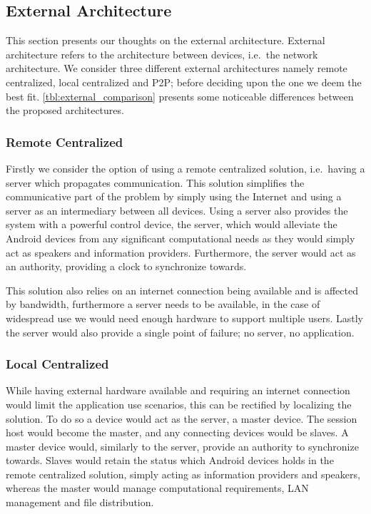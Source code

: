 \subsection{External Architecture}\label{sec:external_architectures}
This section presents our thoughts on the external architecture.
External architecture refers to the architecture between devices, i.e.\ the network architecture.
We consider three different external architectures namely remote centralized, local centralized and \ac{P2P}; before deciding upon the one we deem the best fit.
\cref{tbl:external_comparison} presents some  noticeable differences between the proposed architectures.

\subsubsection{Remote Centralized}
Firstly we consider the option of using a remote centralized solution, i.e.\ having a server which propagates communication.
This solution simplifies the communicative part of the problem by simply using the Internet and using a server as an intermediary between all devices.
Using a server also provides the system with a powerful control device, the server, which would alleviate the Android devices from any significant computational needs as they would simply act as speakers and information providers.
Furthermore, the server would act as an authority, providing a clock to synchronize towards.

This solution also relies on an internet connection being available and is affected by bandwidth, furthermore a server needs to be available, in the case of widespread use we would need enough hardware to support multiple users.
Lastly the server would also provide a single point of failure; no server, no application.

\subsubsection{Local Centralized}
While having external hardware available and requiring an internet connection would limit the application use scenarios, this can be rectified by localizing the solution.
To do so a device would act as the server, a master device.
The session host would become the master, and any connecting devices would be slaves.
A master device would, similarly to the server, provide an authority to synchronize towards.
Slaves would retain the status which Android devices holds in the remote centralized solution, simply acting as information providers and speakers, whereas the master would manage computational requirements, LAN management and file distribution.

